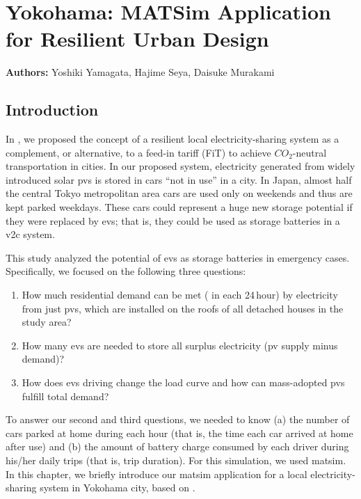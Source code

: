 \chapter{Yokohama: MATSim Application for Resilient Urban Design}
\label{ch:yokohama}
\hfill \textbf{Authors:} Yoshiki Yamagata, Hajime Seya, Daisuke Murakami

\section{Introduction}
In \citet[][]{YamagataSeya_ITSIET_2015}, we proposed the concept of a resilient local electricity-sharing system as a complement, or alternative, to a feed-in tariff (FiT) to achieve $CO_2$-neutral transportation in cities. In our proposed system, electricity generated from widely introduced solar \glspl{pv}
is stored in cars ``not in use'' in a city. In Japan, almost half the central Tokyo metropolitan area cars are used only on weekends and thus are kept parked weekdays. These cars could represent a huge new storage potential if they were replaced by \glspl{ev}; that is, they could be used as storage batteries in a \gls{v2c} system. 

This study analyzed the potential of \glspl{ev} as storage batteries in emergency cases. Specifically, we focused on the following three questions: 
\begin{enumerate}\styleEnumerate
\item How much residential demand can be met ( in each 24\,hour) by electricity from just \glspl{pv}, which are installed on the roofs of all detached houses in the study area? 
\item How many \glspl{ev} are needed to store all surplus electricity (\gls{pv} supply minus demand)?
\item How does \glspl{ev} driving change the load curve and how can mass-adopted \glspl{pv} fulfill total demand? 
\end{enumerate}
To answer our second and third questions, we needed to know (a) the number of cars parked at home during each hour (that is, the time each car arrived at home after use) and (b) the amount of battery charge consumed by each driver during his/her daily trips (that is, trip duration). For this simulation, we used \gls{matsim}. In this chapter, we briefly introduce our \gls{matsim} application for a local electricity-sharing system in Yokohama city, based on \citet[][]{YamagataSeya_ApE_2013, YamagataEtAl_EnPro_2014, YamagataEtAl_ICAE_2015}.


